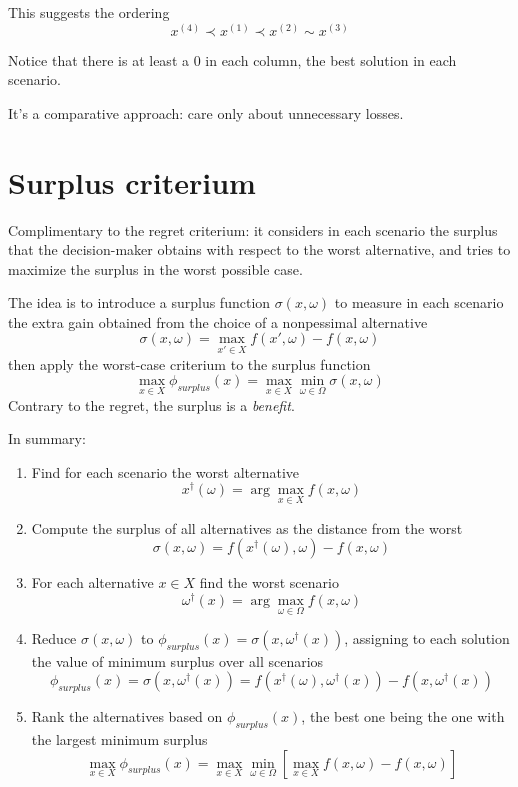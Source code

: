 This suggests the ordering
$$ x^{(4)} \prec x^{(1)} \prec x^{(2)} \sim x^{(3)} $$

Notice that there is at least a 0 in each column, the best solution in each scenario.

It's a comparative approach: care only about unnecessary losses.

\section{Surplus criterium}
\label{sec:surplus}

Complimentary to the regret criterium: it considers in each scenario the surplus that the decision-maker obtains with respect to the worst alternative, and tries to maximize the surplus in the worst possible case. 

The idea is to introduce a surplus function $\sigma (x, \omega)$ to measure in each scenario the extra gain obtained from the choice of a nonpessimal alternative
$$ \sigma (x, \omega) = \max_{x' \in X} f(x', \omega) - f(x, \omega) $$
then apply the worst-case criterium to the surplus function
$$ \max_{x \in X} \phi_{surplus} (x) = \max_{x \in X} \min_{\omega \in \Omega} \sigma (x, \omega) $$
Contrary to the regret, the surplus is a \textit{benefit}.

In summary: 
\begin{enumerate}
	\item Find for each scenario the worst alternative 
	$$x^\dag (\omega) = \arg \max_{x \in X} f(x, \omega) $$
	
	\item Compute the surplus of all alternatives as the distance from the worst
	$$ \sigma (x, \omega) = f(x^\dag (\omega), \omega) - f(x, \omega) $$
	
	\item For each alternative $x \in X$ find the worst scenario
	$$ \omega^\dag (x) = \arg \max_{\omega \in \Omega} f (x, \omega) $$
	
	\item Reduce $\sigma (x, \omega)$ to $\phi_{surplus} (x) = \sigma (x, \omega^\dag (x))$, assigning to each solution the value of minimum surplus over all scenarios
	$$ \phi_{surplus} (x) = \sigma (x, \omega^\dag (x)) = f(x^\dag (\omega), \omega^\dag (x)) - f(x, \omega^\dag (x)) $$
	
	\item Rank the alternatives based on $\phi_{surplus} (x)$, the best one being the one with the largest minimum surplus
	$$ \max_{x \in X} \phi_{surplus} (x) = \max_{x \in X} \min_{\omega \in \Omega} \left[\max_{x \in X} f (x, \omega) - f(x, \omega) \right]$$
\end{enumerate}

